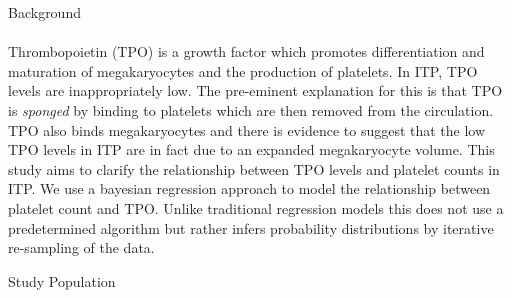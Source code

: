 \documentclass[landscape,a0paper,fontscale=0.285]{beamer} %
\newlength{\onecolwid}
\begin{document}
\begin{frame}[t]
\begin{columns}[t]
\begin{column}{\onecolwid}
\begin{alertblock}{Background}
\paragraph{} Thrombopoietin (TPO) is a growth factor which promotes differentiation and maturation of megakaryocytes and the production of platelets\cite{NishimuraIL1ainducesthrombopoiesis2015a}.
In ITP, TPO levels are inappropriately low. The pre-eminent explanation for this is that TPO is \emph{sponged} by binding to platelets which are then removed from the circulation\cite{Kuterreciprocalrelationshipthrombopoietin1995}. TPO also binds megakaryocytes and there is evidence to suggest that the low TPO levels in ITP are in fact due to an expanded megakaryocyte volume\cite{SatoBindingregulationthrombopoietin1998}. This study aims to clarify the relationship between TPO levels and platelet counts in ITP. We use a bayesian regression approach to model the relationship between platelet count and TPO. Unlike traditional regression models this does not use a predetermined algorithm but rather infers probability distributions by iterative re-sampling of the data\cite{ChaturvediRobustBayesiananalysis1996}. 








\end{alertblock}

\begin{block}{Study Population}


\end{block}
\end{column}
\end{columns}
\end{frame}
\end{document}
